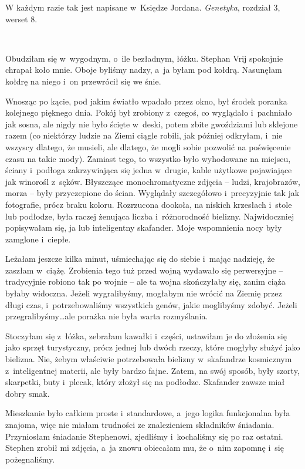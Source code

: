 \documentclass[oneside,polish,11pt,sfheadings]{mwbk}
\begin{document}
W każdym razie tak jest napisane w~Księdze Jordana. \textit{Genetyka},
rozdział 3, werset 8.

~

Obudziłam się w~wygodnym, o~ile bezładnym, łóżku. Stephan Vrij spokojnie
chrapał koło mnie. Oboje byliśmy nadzy, a~ja byłam pod kołdrą. Nasunęłam
kołdrę na niego i~on przewrócił się we śnie.

Wnosząc po kącie, pod jakim światło wpadało przez okno, był środek
poranka kolejnego pięknego dnia. Pokój był zrobiony z~czegoś, co
wyglądało i~pachniało jak sosna, ale nigdy nie było ścięte w~deski,
potem zbite gwoździami lub sklejone razem (co niektórzy ludzie na Ziemi
ciągle robili, jak później odkryłam, i~nie wszyscy dlatego, że musieli,
ale dlatego, że mogli sobie pozwolić na poświęcenie czasu na takie
mody). Zamiast tego, to wszystko było wyhodowane na miejscu, ściany i~podłoga zakrzywiająca się jedna w~drugie, kable użytkowe pojawiające jak
winorośl z~sęków. Błyszczące monochromatyczne zdjęcia -- ludzi,
krajobrazów, morza -- były przyczepione do ścian. Wyglądały szczegółowo i~precyzyjnie tak jak fotografie, prócz braku koloru. Rozrzucona dookoła,
na niskich krzesłach i~stole lub podłodze, była raczej żenująca liczba i~różnorodność bielizny. Najwidoczniej popisywałam się, ja lub
inteligentny skafander. Moje wspomnienia nocy były zamglone i~ciepłe.

Leżałam jeszcze kilka minut, uśmiechając się do siebie i~mając nadzieję,
że zaszłam w~ciążę. Zrobienia tego tuż przed wojną wydawało się
perwersyjne -- tradycyjnie robiono tak po wojnie -- ale ta wojna
skończyłaby się, zanim ciąża byłaby widoczna. Jeżeli wygralibyśmy,
mogłabym nie wrócić na Ziemię przez długi czas, i~potrzebowaliśmy
wszystkich genów, jakie moglibyśmy zdobyć. Jeżeli przegralibyśmy\ldots  ale
porażka nie była warta rozmyślania.

Stoczyłam się z~łóżka, zebrałam kawałki i~części, ustawiłam je do
złożenia się jako sprzęt turystyczny, prócz jednej lub dwóch rzeczy,
które mogłyby służyć jako bielizna. Nie, żebym właściwie potrzebowała
bielizny w~skafandrze kosmicznym z~inteligentnej materii, ale były
bardzo fajne. Zatem, na swój sposób, były szorty, skarpetki, buty i~plecak, który złożył się na podłodze. Skafander zawsze miał dobry smak.

Mieszkanie było całkiem proste i~standardowe, a~jego logika funkcjonalna
była znajoma, więc nie miałam trudności ze znalezieniem składników
śniadania. Przyniosłam śniadanie Stephenowi, zjedliśmy i~kochaliśmy się
po raz ostatni. Stephen zrobił mi zdjęcia, a~ja znowu obiecałam mu, że o~nim zapomnę i~się pożegnaliśmy.
\end{document}
